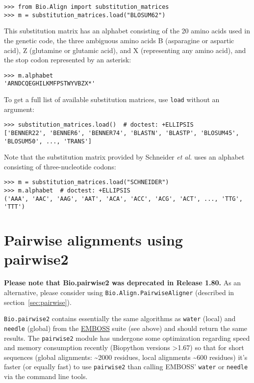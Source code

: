 \begin{verbatim}
>>> from Bio.Align import substitution_matrices
>>> m = substitution_matrices.load("BLOSUM62")
\end{verbatim}
This substitution matrix has an alphabet consisting of the 20 amino acids used in the genetic code, the three ambiguous amino acids B (asparagine or aspartic acid), Z (glutamine or glutamic acid), and X (representing any amino acid), and the stop codon represented by an asterisk:

\begin{verbatim}
>>> m.alphabet
'ARNDCQEGHILKMFPSTWYVBZX*'
\end{verbatim}

To get a full list of available substitution matrices, use \verb+load+ without an argument:

\begin{verbatim}
>>> substitution_matrices.load()  # doctest: +ELLIPSIS
['BENNER22', 'BENNER6', 'BENNER74', 'BLASTN', 'BLASTP', 'BLOSUM45', 'BLOSUM50', ..., 'TRANS']
\end{verbatim}

\hypertarget{codonmatrix}{
Note that the substitution matrix provided by Schneider \textit{et al.} \cite{schneider2005} uses an alphabet consisting of three-nucleotide codons:
}

\begin{verbatim}
>>> m = substitution_matrices.load("SCHNEIDER")
>>> m.alphabet  # doctest: +ELLIPSIS
('AAA', 'AAC', 'AAG', 'AAT', 'ACA', 'ACC', 'ACG', 'ACT', ..., 'TTG', 'TTT')
\end{verbatim}

\section{Pairwise alignments using pairwise2}
\label{sec:pairwise2}

\textbf{Please note that Bio.pairwise2 was deprecated in Release 1.80.} As an alternative, please consider using \verb|Bio.Align.PairwiseAligner| (described in section~\ref{sec:pairwise}).

\verb|Bio.pairwise2| contains essentially the same algorithms as
\texttt{water} (local) and \texttt{needle} (global) from the
\href{http://emboss.sourceforge.net/}{EMBOSS} suite (see above) and should
return the same results. The \verb|pairwise2| module has undergone some
optimization regarding speed and memory consumption recently (Biopython versions
\textgreater 1.67) so that for short sequences (global alignments:
\textasciitilde 2000 residues, local alignments \textasciitilde 600 residues)
it's faster (or equally fast) to use \verb|pairwise2| than calling EMBOSS'
\texttt{water} or \texttt{needle} via the command line tools.

